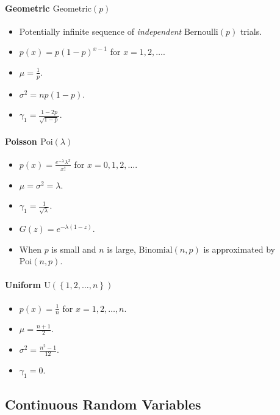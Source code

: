 \documentclass[twocolumn,english]{article}
\begin{document}
\paragraph{Geometric $\text{Geometric}\left(p\right)$}
\begin{itemize}
\item Potentially infinite sequence of \emph{independent} $\text{Bernoulli}\left(p\right)$
trials.
\item $p\left(x\right)=p\left(1-p\right)^{x-1}$ for $x=1,2,\dots$.
\item $\mu=\frac{1}{p}$.
\item $\sigma^{2}=np\left(1-p\right)$.
\item $\gamma_{1}=\frac{1-2p}{\sqrt{1-p}}$.
\end{itemize}

\paragraph{Poisson $\text{Poi}\left(\lambda\right)$}
\begin{itemize}
\item $p\left(x\right)=\frac{e^{-\lambda}\lambda^{x}}{x!}$ for $x=0,1,2,\dots$.
\item $\mu=\sigma^{2}=\lambda$.
\item $\gamma_{1}=\frac{1}{\sqrt{\lambda}}$.
\item $G\left(z\right)=e^{-\lambda\left(1-z\right)}$.
\item When $p$ is small and $n$ is large, $\text{Binomial}\left(n,p\right)$
is approximated by $\text{Poi}\left(n,p\right)$.
\end{itemize}

\paragraph{Uniform $\text{U}\left(\left\{ 1,2,\dots,n\right\} \right)$}
\begin{itemize}
\item $p\left(x\right)=\frac{1}{n}$ for $x=1,2,\dots,n$.
\item $\mu=\frac{n+1}{2}$.
\item $\sigma^{2}=\frac{n^{2}-1}{12}$.
\item $\gamma_{1}=0$.
\end{itemize}

\subsection{Continuous Random Variables}
\end{document}
